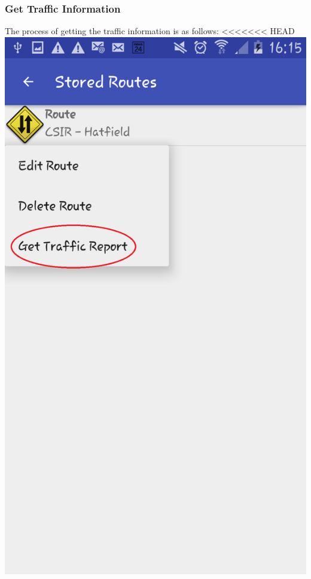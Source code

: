 \documentclass[a4paper,12pt]{article}
\begin{document}
\subsubsection{Get Traffic Information}
The process of getting the traffic information is as follows:
<<<<<<< HEAD
\includegraphics[width=\textwidth]{images/TrafficReportOption.png}
\end{document}
